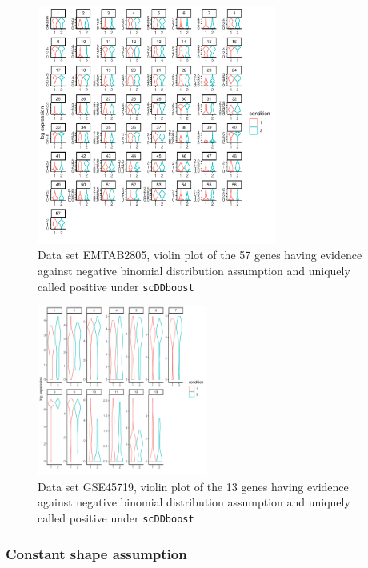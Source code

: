 \documentclass[aoas,preprint]{imsart}
\begin{document}
\begin{figure}[h]
\includegraphics[width = 0.7\textwidth]{Figs/NBgene.pdf}
\caption{Data set EMTAB2805, violin plot of the 57 genes having evidence against negative binomial distribution assumption and uniquely called positive under \texttt{scDDboost}}
\label{fig:s11}
\end{figure}

\begin{figure}[h]
\includegraphics[width = 0.5\textwidth]{Figs/NBgene2.pdf}
\caption{Data set GSE45719, violin plot of the 13 genes having evidence against negative binomial distribution assumption and uniquely called positive under \texttt{scDDboost}}
\label{fig:s12}
\end{figure}


\subsubsection{Constant shape assumption}
\end{document}

